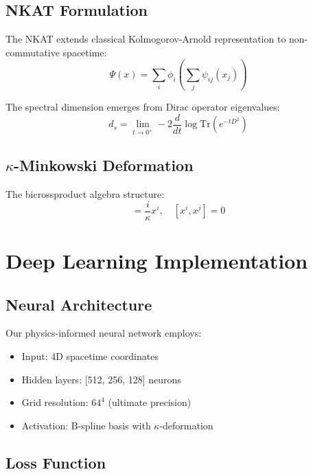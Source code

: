 \documentclass[twocolumn,showpacs,preprintnumbers,amsmath,amssymb,aps,prl]{revtex4-1}
\begin{document}
\subsection{NKAT Formulation}

The NKAT extends classical Kolmogorov-Arnold representation to non-commutative spacetime:
\begin{equation}
\Psi(x) = \sum_i \phi_i\left(\sum_j \psi_{ij}(x_j)\right)
\label{eq:nkat}
\end{equation}

The spectral dimension emerges from Dirac operator eigenvalues:
\begin{equation}
d_s = \lim_{t \to 0^+} -2 \frac{d}{dt} \log \text{Tr}(e^{-tD^2})
\label{eq:spectral}
\end{equation}

\subsection{$\kappa$-Minkowski Deformation}

The bicrossproduct algebra structure:
\begin{equation}
[x^0, x^i] = \frac{i}{\kappa} x^i, \quad [x^i, x^j] = 0
\label{eq:kappa}
\end{equation}

\section{Deep Learning Implementation}

\subsection{Neural Architecture}

Our physics-informed neural network employs:
\begin{itemize}
\item Input: 4D spacetime coordinates
\item Hidden layers: [512, 256, 128] neurons
\item Grid resolution: $64^4$ (ultimate precision)
\item Activation: B-spline basis with $\kappa$-deformation
\end{itemize}

\subsection{Loss Function}
\end{document}
